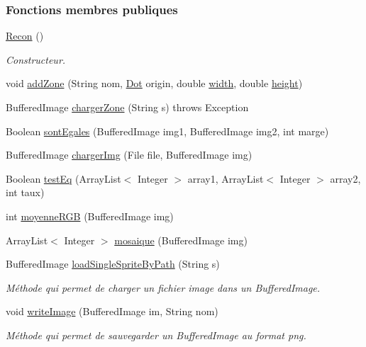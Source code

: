 \subsubsection*{Fonctions membres publiques}
\begin{DoxyCompactItemize}
\item 
\hyperlink{classPictures_1_1Recon_a58f3d19ccf17aee1c66a764da0e1a7bb}{Recon} ()
\begin{DoxyCompactList}\small\item\em Constructeur. \end{DoxyCompactList}\item 
void \hyperlink{classPictures_1_1Recon_a3952c4456f5fb8ea3a5e12813cbb55d4}{add\+Zone} (String nom, \hyperlink{classSuchi_1_1Dot}{Dot} origin, double \hyperlink{classPictures_1_1Recon_a3206c6aac74a4f37fb29176a3c8f7d2a}{width}, double \hyperlink{classPictures_1_1Recon_aed3f893251cf156b4764d5110c1e481f}{height})
\item 
Buffered\+Image \hyperlink{classPictures_1_1Recon_a32dacf996a1a805ea59587da111710d6}{charger\+Zone} (String s)  throws Exception 
\item 
Boolean \hyperlink{classPictures_1_1Recon_a7af8127f4f9a99fda191069ed193ab6d}{sont\+Egales} (Buffered\+Image img1, Buffered\+Image img2, int marge)
\item 
Buffered\+Image \hyperlink{classPictures_1_1Recon_a950ef9ce55525459fc2cb7b41af6bb52}{charger\+Img} (File file, Buffered\+Image img)
\item 
Boolean \hyperlink{classPictures_1_1Recon_a5900d9a17fee84f9bbeaa3118c9fcc80}{test\+Eq} (Array\+List$<$ Integer $>$ array1, Array\+List$<$ Integer $>$ array2, int taux)
\item 
int \hyperlink{classPictures_1_1Recon_a12e2ecbe325d9fd215581e7cf7983891}{moyenne\+R\+G\+B} (Buffered\+Image img)
\item 
Array\+List$<$ Integer $>$ \hyperlink{classPictures_1_1Recon_a2b28d09d5a84c3e5d74f57ee7f12a871}{mosaique} (Buffered\+Image img)
\item 
Buffered\+Image \hyperlink{classPictures_1_1Recon_a09d739384990936e43a321c922954b38}{load\+Single\+Sprite\+By\+Path} (String s)
\begin{DoxyCompactList}\small\item\em Méthode qui permet de charger un fichier image dans un Buffered\+Image. \end{DoxyCompactList}\item 
void \hyperlink{classPictures_1_1Recon_a468a82248dcef1c4899ac7bbc9f865e6}{write\+Image} (Buffered\+Image im, String nom)
\begin{DoxyCompactList}\small\item\em Méthode qui permet de sauvegarder un Buffered\+Image au format png. \end{DoxyCompactList}\end{DoxyCompactItemize}
